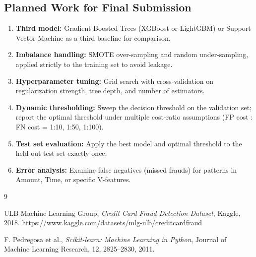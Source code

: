 \documentclass[11pt, a4paper]{article}
\begin{document}
\subsection{Planned Work for Final Submission}

\begin{enumerate}[noitemsep]
    \item \textbf{Third model:} Gradient Boosted Trees (XGBoost or LightGBM) or Support
          Vector Machine as a third baseline for comparison.
    \item \textbf{Imbalance handling:} SMOTE over-sampling and random under-sampling,
          applied strictly to the training set to avoid leakage.
    \item \textbf{Hyperparameter tuning:} Grid search with cross-validation on
          regularization strength, tree depth, and number of estimators.
    \item \textbf{Dynamic thresholding:} Sweep the decision threshold on the validation
          set; report the optimal threshold under multiple cost-ratio assumptions
          (FP cost : FN cost = 1:10, 1:50, 1:100).
    \item \textbf{Test set evaluation:} Apply the best model and optimal threshold to the
          held-out test set exactly once.
    \item \textbf{Error analysis:} Examine false negatives (missed frauds) for patterns
          in Amount, Time, or specific V-features.
\end{enumerate}

\begin{thebibliography}{9}

    ULB Machine Learning Group,
    \textit{Credit Card Fraud Detection Dataset},
    Kaggle, 2018.
    \url{https://www.kaggle.com/datasets/mlg-ulb/creditcardfraud}

    F. Pedregosa et al.,
    \textit{Scikit-learn: Machine Learning in Python},
    Journal of Machine Learning Research, 12, 2825--2830, 2011.

\end{thebibliography}
\end{document}
